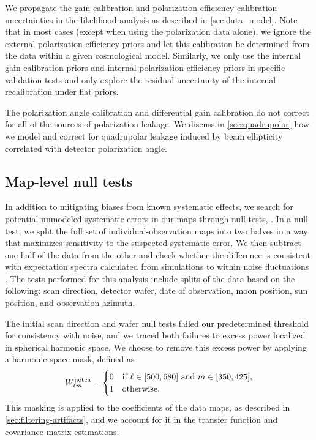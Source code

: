 We propagate the gain calibration and polarization efficiency calibration uncertainties in the likelihood analysis as described in \cref{sec:data_model}. Note that in most cases (except when using the polarization data alone), we ignore the external polarization efficiency priors and let this calibration be determined from the data within a given cosmological model. 
Similarly, we only use the internal gain calibration priors and internal polarization efficiency priors in specific validation tests and only explore the residual uncertainty of the internal recalibration under flat priors.

The polarization angle calibration and differential gain calibration do not correct for all of the sources of polarization leakage. We discuss in \cref{sec:quadrupolar} how we model and correct for quadrupolar leakage induced by beam ellipticity correlated with detector polarization angle.

\subsection{Map-level null tests}
\label{sec:null}
In addition to mitigating biases from known systematic effects, we search for potential unmodeled systematic errors in our maps through null tests, . In a null test, we split the full set of individual-observation maps into two halves in a way that maximizes sensitivity 
to the suspected systematic error. We then subtract one half of the data from the other and check whether the difference is consistent with expectation spectra calculated from simulations to within noise fluctuations .
The tests performed for this analysis include splits of the data based on the following: scan direction, detector wafer, date of observation, moon position, sun position, and observation azimuth. 

The initial scan direction and wafer null tests failed our predetermined threshold for consistency with noise, and we traced both failures to excess power localized in spherical harmonic space.
We choose to remove this excess power by applying a harmonic-space mask, defined as
\begin{equation}
	\label{eq:notch}
	W^{\rm notch}_{\ell m} = \begin{cases}
		0 & \text{if } \ell \in [500, 680] \text{ and } m \in [350, 425], \\
		1 & \text{otherwise}.
	\end{cases}
\end{equation}
This masking is applied to the \alm{} coefficients of the data maps, as described in \cref{sec:filtering-artifacts}, and we account for it in the transfer function and covariance matrix estimations. 

